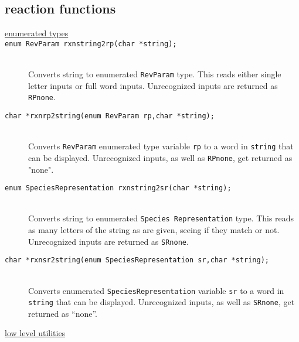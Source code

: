 \documentclass {book}
\begin{document}
\subsection*{reaction functions}

\begin{description}

\item[\underline{enumerated types}]

\item[\texttt{enum RevParam rxnstring2rp(char *string);}]
\hfill \\
Converts string to enumerated \texttt{RevParam} type. This reads either single letter inputs or full word inputs. Unrecognized inputs are returned as \texttt{RPnone}.

\item[\texttt{char *rxnrp2string(enum RevParam rp,char *string);}]
\hfill \\
Converts \texttt{RevParam} enumerated type variable \texttt{rp} to a word in \texttt{string} that can be displayed. Unrecognized inputs, as well as \texttt{RPnone}, get returned as "none".

\item[\texttt{enum SpeciesRepresentation rxnstring2sr(char *string);}]
\hfill \\
Converts string to enumerated \texttt{Species Representation} type. This reads as many letters of the string as are given, seeing if they match or not. Unrecognized inputs are returned as \texttt{SRnone}.

\item[\texttt{char *rxnsr2string(enum SpeciesRepresentation sr,char *string);}]
\hfill \\
Converts enumerated \texttt{SpeciesRepresentation} variable \texttt{sr} to a word in \texttt{string} that can be displayed. Unrecognized inputs, as well as \texttt{SRnone}, get returned as ``none''.

\item[\underline{low level utilities}]


\end{description}
\end{document}
